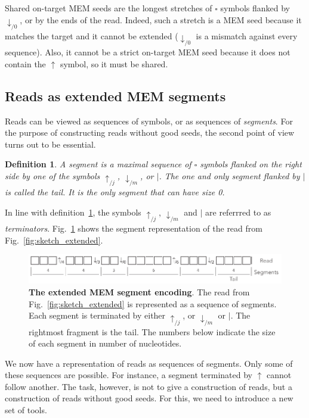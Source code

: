 \documentclass{article}
\newtheorem{definition}{Definition}
\begin{document}
Shared on-target MEM seeds are the longest stretches of $\square$ symbols
flanked by $\downarrow_{/0}$, or by the ends of the read. Indeed, such a
stretch is a MEM seed because it matches the target and it cannot be
extended ($\downarrow_{/0}$ is a mismatch against every sequence). Also,
it cannot be a strict on-target MEM seed because it does not contain the
$\uparrow$ symbol, so it must be shared.

\subsection{Reads as extended MEM segments}

Reads can be viewed as sequences of symbols, or as sequences of
\emph{segments}. For the purpose of constructing reads without good seeds,
the second point of view turns out to be essential.

\begin{definition}
\label{def:segment}
A segment is a maximal sequence of $\square$ symbols flanked on the right
side by one of the symbols $\uparrow_{/j}$, $\downarrow_{/m}$, or $|$. The
one and only segment flanked by $|$ is called the tail. It is the only
segment that can have size 0.
\end{definition}

In line with definition~\ref{def:segment}, the symbols $\uparrow_{/j}$,
$\downarrow_{/m}$ and $|$ are referrred to as \emph{terminators}.
Fig.~\ref{fig:sketch_segment} shows the segment representation of the read
from Fig.~\ref{fig:sketch_extended}.

\begin{figure}[h]
\centering
\includegraphics[scale=.85]{sketch_segments.pdf}
\caption{\textbf{The extended MEM segment encoding}.
The read from Fig.~\ref{fig:sketch_extended} is represented as a sequence
of segments. Each segment is terminated by either $\uparrow_{/j}$, or
$\downarrow_{/m}$ or $|$. The rightmost fragment is the tail. The numbers
below indicate the size of each segment in number of nucleotides.}
\label{fig:sketch_segment}
\end{figure}


We now have a representation of reads as sequences of segments. Only some
of these sequences are possible. For instance, a segment terminated by
$\uparrow$ cannot follow another. The task, however, is not to give a
construction of reads, but a construction of reads without good seeds. For
this, we need to introduce a new set of tools.
\end{document}
